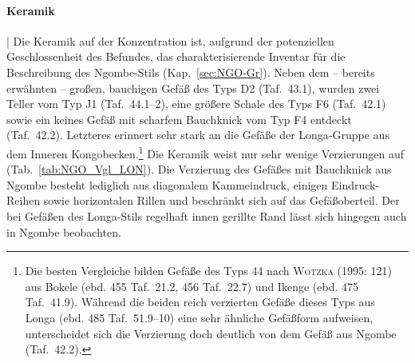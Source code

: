 \paragraph{Keramik}\hspace{-.5em}|\hspace{.5em}%
Die Keramik auf der Konzentration ist, aufgrund der potenziellen Geschlossenheit des Befundes, das charakterisierende Inventar für die Beschreibung des Ngombe-Stils (Kap.~\ref{sec:NGO-Gr}). Neben dem -- bereits erwähnten -- großen, bauchigen Gefäß des Typs D2 (Taf.~43.1), wurden zwei Teller vom Typ J1 (Taf.~44.1--2), eine größere Schale des Typs F6 (Taf.~42.1) sowie ein keines Gefäß mit scharfem Bauchknick vom Typ F4 entdeckt (Taf.~42.2). Letzteres erinnert sehr stark an die Gefäße der Longa-Gruppe \parencite[121 Typ 44]{Wotzka.1995} aus dem Inneren Kongobecken.\footnote{Die besten Vergleiche bilden Gefäße des Typs 44 nach \textsc{Wotzka} (1995: 121) aus Bokele (ebd. 455 Taf.~21.2, 456 Taf.~22.7) und Ikenge (ebd. 475 Taf.~41.9). Während die beiden reich verzierten Gefäße dieses Typs aus Longa (ebd. 485 Taf.~51.9--10) eine sehr ähnliche Gefäßform aufweisen, unterscheidet sich die Verzierung doch deutlich von dem Gefäß aus Ngombe (Taf.~42.2).} Die Keramik weist nur sehr wenige Verzierungen auf (Tab.~\ref{tab:NGO_Vgl_LON}). Die Verzierung des Gefäßes mit Bauchknick aus Ngombe besteht lediglich aus diagonalem Kammeindruck, einigen Eindruck-Reihen sowie horizontalen Rillen und beschränkt sich auf das Gefäßoberteil. Der bei Gefäßen des Longa-Stils regelhaft innen gerillte Rand lässt sich hingegen auch in Ngombe beobachten.

\begin{table*}[!t]
	\caption{MIT~87/103 \& MKA~87/102: Radiokohlenstoffdatierungen.}
	\label{tab:MIT87-103_14C-Daten}\label{tab:MKA87-102_14C-Daten}
\end{table*}

